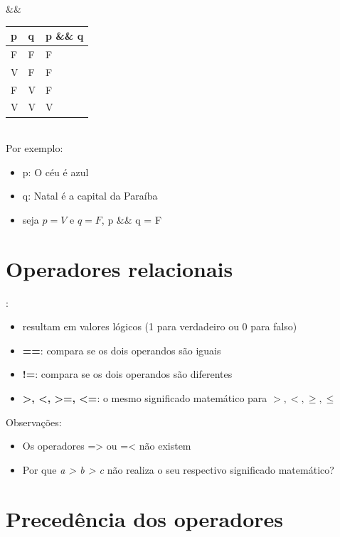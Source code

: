 \documentclass[portuguese,10pt,xcolor=table]{beamer}
\begin{document}
    \begin{frame}
		 \&\&\\
    	\begin{tabular}{|l|l|l|}
    		\hline
			\textbf{p} & \textbf{q} & \textbf{p \&\& q}\\
    		\hline
    		F& F& F\\
    		\hline
    		V& F& F\\
    		\hline
    		F& V& F\\
    		\hline
    		V& V& V\\
    		\hline
    	\end{tabular}\\\vspace{1cm}
    	Por exemplo:
    	\begin{itemize}
    		\item p: O céu é azul
			\item q: Natal é a capital da Paraíba
			\item seja $p = V$ e $q = F$, p \&\& q = F
    	\end{itemize}
    \end{frame}
    

\section{Operadores relacionais}
	\begin{frame}
	:
		
		\begin{itemize}
			\item resultam em valores lógicos (1 para verdadeiro ou 0 para falso)
			\item \textbf{==}: compara se os dois operandos são iguais
			\item \textbf{!=}: compara se os dois operandos são diferentes
			\item \textbf{>, <, >=, <=}: o mesmo significado matemático para $>, <, \ge , \le $
		\end{itemize}
		Observações:
		\begin{itemize}
			\item Os operadores => ou =< não existem
			\item Por que \textit{a > b > c} não realiza o seu respectivo significado matemático?
		\end{itemize}
	\end{frame}

\section{Precedência dos operadores}
\end{document}
